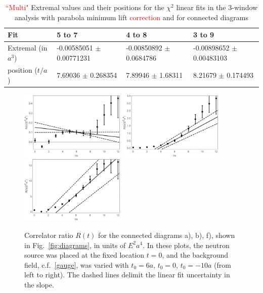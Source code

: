 \begin{table}
\begin{center}
    \begin{tabular}{ | l | p{2.2cm} | p{2.2cm} | p{2.2cm} |}
    \hline
     Fit & 5 to 7   &4 to 8   & 3 to 9  \\ \hline
     Extremal (in $a^3$)&   -0.00585051 $\pm$ 0.00771231   &  -0.00850892 $\pm$ 0.0684786   &  -0.00898652 $\pm$ 0.00483103   \\ \hline
     position ($t/a$)&  7.69036 $\pm$ 0.268354   &  7.89946 $\pm$ 1.68311   &   8.21679 $\pm$ 0.174493    \\ \hline
    \end{tabular}
\end{center}
\caption{\textcolor{red}{``Multi"} Extremal values and their positions for the $\chi^2$ linear fits in the 3-window analysis with parabola minimum lift \textcolor{red}{correction} and for connected diagrams}
\label{Table:ConnectedMulti}
\end{table}
\begin{figure}[h!]
\centering
\includegraphics[width=5cm]{figures/shshLineCS.png}
\includegraphics[width=5cm]{figures/from0LineCS.png}
\includegraphics[width=5cm]{figures/shortLineCS.png}\\
\caption{Correlator ratio $R(t)$ for the connected diagrams a), b), f), shown in Fig.~\ref{fig:diagrams}, in units of $E^2a^4$. In these plots, the neutron source was placed at the fixed location $t=0$, and the background field, c.f.~\ref{gauge}, was varied with $t_0=6a$, $t_0=0$, $t_0=-10a$ (from left to right). The dashed lines delimit the linear fit uncertainty in the slope.}
\label{fig: alphaconnected}
\end{figure}

